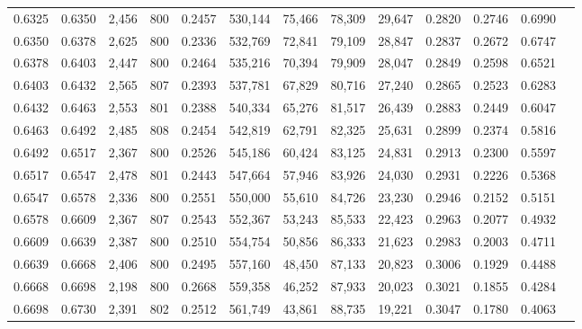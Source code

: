 \begin{tabular}{rrrrrrrrrrrrr}
0.6325 & 0.6350 &  2,456 & 800 &                                     0.2457 & 530,144 &  75,466 &  78,309 &  29,647 & 0.2820 & 0.2746 & 0.6990 \\
0.6350 & 0.6378 &  2,625 & 800 &                                     0.2336 & 532,769 &  72,841 &  79,109 &  28,847 & 0.2837 & 0.2672 & 0.6747 \\
0.6378 & 0.6403 &  2,447 & 800 &                                     0.2464 & 535,216 &  70,394 &  79,909 &  28,047 & 0.2849 & 0.2598 & 0.6521 \\
0.6403 & 0.6432 &  2,565 & 807 &                                     0.2393 & 537,781 &  67,829 &  80,716 &  27,240 & 0.2865 & 0.2523 & 0.6283 \\
0.6432 & 0.6463 &  2,553 & 801 &                                     0.2388 & 540,334 &  65,276 &  81,517 &  26,439 & 0.2883 & 0.2449 & 0.6047 \\
0.6463 & 0.6492 &  2,485 & 808 &                                     0.2454 & 542,819 &  62,791 &  82,325 &  25,631 & 0.2899 & 0.2374 & 0.5816 \\
0.6492 & 0.6517 &  2,367 & 800 &                                     0.2526 & 545,186 &  60,424 &  83,125 &  24,831 & 0.2913 & 0.2300 & 0.5597 \\
0.6517 & 0.6547 &  2,478 & 801 &                                     0.2443 & 547,664 &  57,946 &  83,926 &  24,030 & 0.2931 & 0.2226 & 0.5368 \\
0.6547 & 0.6578 &  2,336 & 800 &                                     0.2551 & 550,000 &  55,610 &  84,726 &  23,230 & 0.2946 & 0.2152 & 0.5151 \\
0.6578 & 0.6609 &  2,367 & 807 &                                     0.2543 & 552,367 &  53,243 &  85,533 &  22,423 & 0.2963 & 0.2077 & 0.4932 \\
0.6609 & 0.6639 &  2,387 & 800 &                                     0.2510 & 554,754 &  50,856 &  86,333 &  21,623 & 0.2983 & 0.2003 & 0.4711 \\
0.6639 & 0.6668 &  2,406 & 800 &                                     0.2495 & 557,160 &  48,450 &  87,133 &  20,823 & 0.3006 & 0.1929 & 0.4488 \\
0.6668 & 0.6698 &  2,198 & 800 &                                     0.2668 & 559,358 &  46,252 &  87,933 &  20,023 & 0.3021 & 0.1855 & 0.4284 \\
0.6698 & 0.6730 &  2,391 & 802 &                                     0.2512 & 561,749 &  43,861 &  88,735 &  19,221 & 0.3047 & 0.1780 & 0.4063 \\

\end{tabular}
